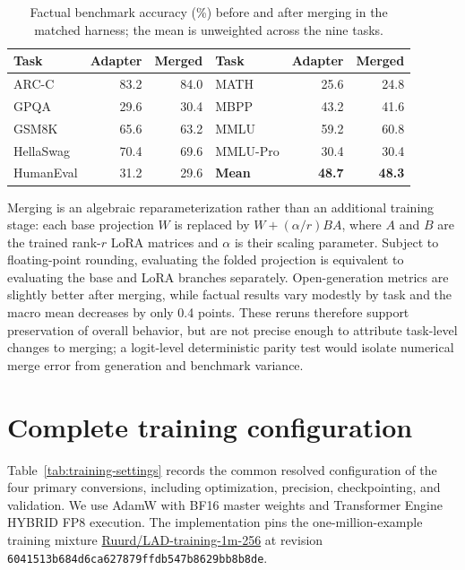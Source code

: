 \documentclass{article}
\begin{document}
\begin{table}[!htbp]
\caption{Factual benchmark accuracy (\%) before and after merging in the matched harness; the mean is unweighted across the nine tasks.}
\label{tab:merge-benchmarks}
\centering
\small
\begin{tabular}{lrr@{\qquad}lrr}
\toprule
Task & Adapter & Merged & Task & Adapter & Merged \\
\midrule
ARC-C      & 83.2 & 84.0 & MATH     & 25.6 & 24.8 \\
GPQA       & 29.6 & 30.4 & MBPP     & 43.2 & 41.6 \\
GSM8K      & 65.6 & 63.2 & MMLU     & 59.2 & 60.8 \\
HellaSwag  & 70.4 & 69.6 & MMLU-Pro & 30.4 & 30.4 \\
HumanEval  & 31.2 & 29.6 & \textbf{Mean} & \textbf{48.7} & \textbf{48.3} \\
\bottomrule
\end{tabular}
\end{table}

Merging is an algebraic reparameterization rather than an additional training stage: each base projection $W$ is replaced by $W+(\alpha/r)BA$, where $A$ and $B$ are the trained rank-$r$ LoRA matrices and $\alpha$ is their scaling parameter. Subject to floating-point rounding, evaluating the folded projection is equivalent to evaluating the base and LoRA branches separately. Open-generation metrics are slightly better after merging, while factual results vary modestly by task and the macro mean decreases by only 0.4 points. These reruns therefore support preservation of overall behavior, but are not precise enough to attribute task-level changes to merging; a logit-level deterministic parity test would isolate numerical merge error from generation and benchmark variance.

\section{Complete training configuration}
\label{app:training-settings}

Table~\ref{tab:training-settings} records the common resolved configuration of the four primary conversions, including optimization, precision, checkpointing, and validation. We use AdamW with BF16 master weights and Transformer Engine HYBRID FP8 execution. The implementation pins the one-million-example training mixture \href{https://huggingface.co/datasets/Ruurd/LAD-training-1m-256}{Ruurd/LAD-training-1m-256} at revision \nolinkurl{6041513b684d6ca627879ffdb547b8629bb8b8de}.
\end{document}
